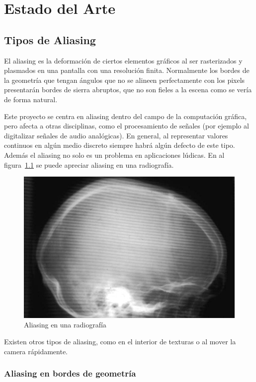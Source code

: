 \documentclass[withindex, glossary]{cam-thesis}
\begin{document}
\chapter{Estado del Arte}

\section{Tipos de Aliasing}

El aliasing es la deformación de ciertos elementos gráficos al ser rasterizados y plasmados en una pantalla con una resolución finita\cite{Mitchell:1988:RFC:378456.378514}. Normalmente los bordes de la geometría que tengan ángulos que no se alineen perfectamente con los pixels presentarán bordes de sierra abruptos, que no son fieles a la escena como se vería de forma natural.

Este proyecto se centra en aliasing dentro del campo de la computación gráfica, pero afecta a otras disciplinas, como el procesamiento de señales (por ejemplo al digitalizar señales de audio analógicas). En general, al representar valores continuos en algún medio discreto siempre habrá algún defecto de este tipo\cite{Mitchell:1988:RFC:378456.378514}. Además el aliasing no solo es un problema en aplicaciones lúdicas. En al figura~\ref{skull} se puede apreciar aliasing en una radiografía.

\begin{figure}[!htbp]
    \includegraphics[width=.7\linewidth]{figures/skull.jpg}
    \caption{Aliasing en una radiografía\cite{rayos}\label{skull}}
\end{figure}

Existen otros tipos de aliasing, como en el interior de texturas o al mover la camera rápidamente.

\subsection{Aliasing en bordes de geometría}
\end{document}
